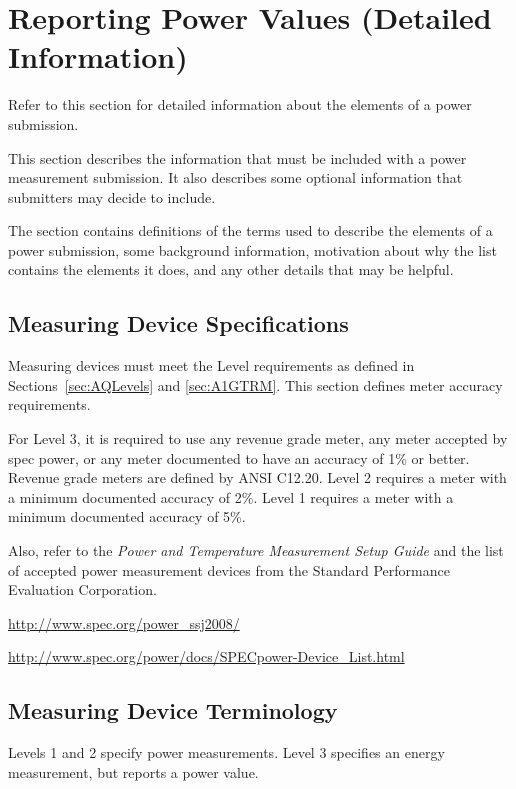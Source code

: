 \chapter{Reporting Power Values \normalsize{(Detailed Information)}}
\label{sec:reporting}

\noindent
Refer to this section for detailed information about the elements of a power submission. 
\wl

\noindent
This section describes the information that must be included with a power measurement submission. It also describes some optional information that submitters may decide to include.
\wl

\noindent
The section contains definitions of the terms used to describe the elements of a power submission, some background information, motivation about why the list contains the elements it does, and any other details that may be helpful.
\noindent


\section{Measuring Device Specifications}
\label{sec:MDSpecs}
\noindent
Measuring devices must meet the Level requirements as defined in 
Sections~\ref{sec:AQLevels} and \ref{sec:A1GTRM}. This section defines meter accuracy requirements.
\wl

\noindent
For Level 3, it is required to use any revenue grade meter, any meter accepted by spec power, or any meter documented to have an accuracy of 1\% or better. 
Revenue grade meters are defined by ANSI C12.20.  
Level 2 requires a meter with a minimum documented accuracy of 2\%.
Level 1 requires a meter with a minimum documented accuracy of 5\%.
\wl

\noindent
Also, refer to 
the {\itshape Power and Temperature Measurement Setup Guide \/} and the list of accepted power measurement devices from the Standard Performance Evaluation Corporation.
\wl

\noindent
\url{http://www.spec.org/power_ssj2008/}

\noindent
\url{http://www.spec.org/power/docs/SPECpower-Device_List.html }

\section{Measuring Device Terminology}
\label{sec:MDTerm}
\noindent
Levels 1 and 2 specify power measurements. Level 3 specifies an energy measurement, but reports a power value.


